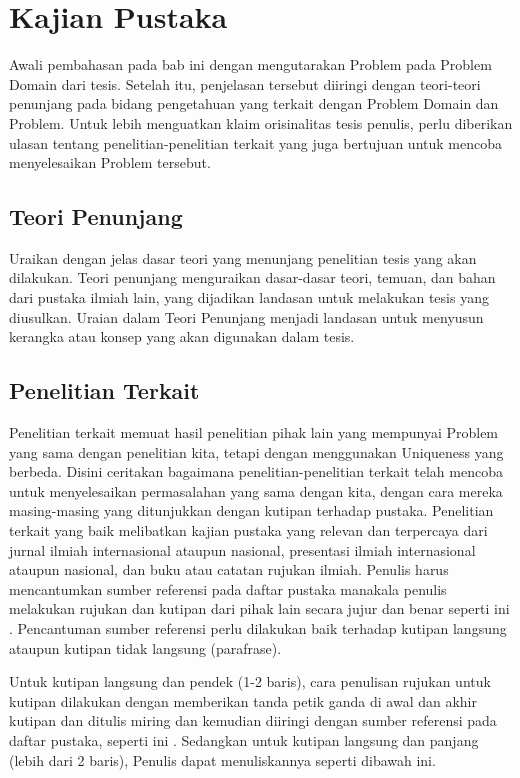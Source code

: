 \chapter{Kajian Pustaka}
\label{bab:kajian-pustaka}

Awali pembahasan pada bab ini dengan mengutarakan Problem pada Problem Domain
dari tesis. Setelah itu, penjelasan tersebut diiringi dengan teori-teori
penunjang pada bidang pengetahuan yang terkait dengan Problem Domain dan
Problem. Untuk lebih menguatkan klaim orisinalitas tesis penulis, perlu
diberikan ulasan tentang penelitian-penelitian terkait yang juga bertujuan
untuk mencoba menyelesaikan Problem tersebut.

\section{Teori Penunjang}

Uraikan dengan jelas dasar teori yang menunjang penelitian tesis yang akan
dilakukan. Teori penunjang menguraikan dasar-dasar teori, temuan, dan bahan dari
pustaka ilmiah lain, yang dijadikan landasan untuk melakukan tesis yang
diusulkan. Uraian dalam Teori Penunjang menjadi landasan untuk menyusun
kerangka atau konsep yang akan digunakan dalam tesis.

\section{Penelitian Terkait}

Penelitian terkait memuat hasil penelitian pihak lain yang mempunyai Problem
yang sama dengan penelitian kita, tetapi dengan menggunakan Uniqueness yang
berbeda. Disini ceritakan bagaimana penelitian-penelitian terkait telah mencoba
untuk menyelesaikan permasalahan yang sama dengan kita, dengan cara mereka
masing-masing yang ditunjukkan dengan kutipan terhadap pustaka. Penelitian
terkait yang baik melibatkan kajian pustaka yang relevan dan terpercaya dari
jurnal ilmiah internasional ataupun nasional, presentasi ilmiah internasional
ataupun nasional, dan buku atau catatan rujukan ilmiah. Penulis harus
mencantumkan sumber referensi pada daftar pustaka manakala penulis melakukan
rujukan dan kutipan dari pihak lain secara jujur dan benar seperti ini
\cite{pengarang2013jurnal}. Pencantuman sumber referensi perlu dilakukan baik
terhadap kutipan langsung ataupun kutipan tidak langsung (parafrase).

Untuk kutipan langsung dan pendek (1-2 baris), cara penulisan rujukan untuk
kutipan dilakukan dengan memberikan tanda petik ganda di awal dan akhir kutipan
dan ditulis miring dan kemudian diiringi dengan sumber referensi pada daftar
pustaka, seperti ini  \cite{pengarang2014buku,mahasiswa2011tesis}. Sedangkan untuk kutipan
langsung dan panjang (lebih dari 2 baris), Penulis dapat menuliskannya seperti
dibawah ini.

